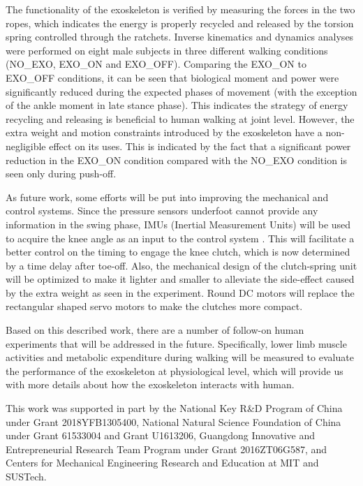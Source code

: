 \documentclass[twocolumn,cleanfoot,10pt]{asme2ej}
\begin{document}
The functionality of the exoskeleton is verified by measuring the forces in the two ropes, which indicates the energy is properly recycled and released by the torsion spring controlled through the ratchets.
Inverse kinematics and dynamics analyses were performed on eight male subjects in three different walking conditions (NO\_EXO, EXO\_ON and EXO\_OFF).
Comparing the EXO\_ON to EXO\_OFF conditions, it can be seen that biological moment and power were significantly reduced during the expected phases of movement (with the exception of the ankle moment in late stance phase).
This indicates the strategy of energy recycling and releasing is beneficial to human walking at joint level.
However, the extra weight and motion constraints introduced by the exoskeleton have a non-negligible effect on its uses.
This is indicated by the fact that a significant power reduction in the EXO\_ON condition compared with the NO\_EXO condition is seen only during push-off.

As future work, some efforts will be put into improving the mechanical and control systems.
Since the pressure sensors underfoot cannot provide any information in the swing phase, IMUs (Inertial Measurement Units) will be used to acquire the knee angle as an input to the control system \cite{IMU2}.
This will facilitate a better control on the timing to engage the knee clutch, which is now determined by a time delay after toe-off.
Also, the mechanical design of the clutch-spring unit will be optimized to make it lighter and smaller to alleviate the side-effect caused by the extra weight as seen in the experiment.
Round DC motors will replace the rectangular shaped servo motors to make the clutches more compact. 

Based on this described work, there are a number of follow-on human experiments that will be addressed in the future.
Specifically, lower limb muscle activities and metabolic expenditure during walking will be measured to evaluate the performance of the exoskeleton at physiological level, which will provide us with more details about how the exoskeleton interacts with human.

\begin{acknowledgment}
This work was supported in part by the National Key R\&D Program of China under Grant 2018YFB1305400, National Natural Science Foundation of China under Grant 61533004 and Grant U1613206, Guangdong Innovative and Entrepreneurial Research Team Program under Grant 2016ZT06G587, and Centers for Mechanical Engineering Research and Education at MIT and SUSTech.
\end{acknowledgment}
\end{document}
